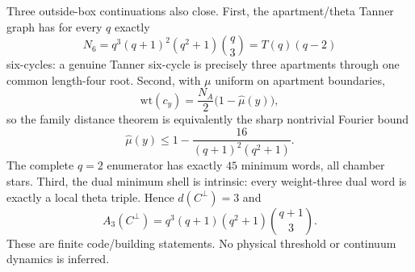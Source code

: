 Three outside-box continuations also close. First, the apartment/theta Tanner graph has for every $q$ exactly
\[
 N_6=q^3(q+1)^2(q^2+1)\binom q3=T(q)(q-2)
\]
six-cycles: a genuine Tanner six-cycle is precisely three apartments through one common length-four root. Second, with $\mu$ uniform on apartment boundaries,
\[
 \mathrm{wt}(c_y)=\frac{N_A}{2}\bigl(1-\widehat\mu(y)\bigr),
\]
so the family distance theorem is equivalently the sharp nontrivial Fourier bound
\[
 \widehat\mu(y)\le 1-\frac{16}{(q+1)^2(q^2+1)}.
\]
The complete $q=2$ enumerator has exactly $45$ minimum words, all chamber stars. Third, the dual minimum shell is intrinsic: every weight-three dual word is exactly a local theta triple. Hence $d(C^\perp)=3$ and
\[
 A_3(C^\perp)=q^3(q+1)(q^2+1)\binom{q+1}{3}.
\]
These are finite code/building statements. No physical threshold or continuum dynamics is inferred.
\fi
%
